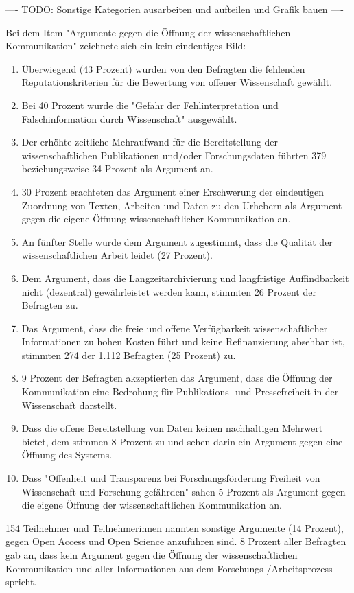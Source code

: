 ---- TODO: Sonstige Kategorien ausarbeiten und aufteilen und Grafik bauen ----

Bei dem Item "Argumente gegen die Öffnung der wissenschaftlichen Kommunikation" zeichnete sich ein kein eindeutiges Bild:
\begin{enumerate}
\item Überwiegend (43 Prozent) wurden von den Befragten die fehlenden Reputationskriterien für die Bewertung von offener Wissenschaft gewählt.
\item Bei 40 Prozent wurde die "Gefahr der Fehlinterpretation und Falschinformation durch Wissenschaft" ausgewählt.
\item Der erhöhte zeitliche Mehraufwand für die Bereitstellung der wissenschaftlichen Publikationen und/oder Forschungsdaten führten 379 beziehungsweise 34 Prozent als Argument an.
\item 30 Prozent erachteten das Argument einer Erschwerung der eindeutigen Zuordnung von Texten, Arbeiten und Daten zu den Urhebern als Argument gegen die eigene Öffnung wissenschaftlicher Kommunikation an.
\item An fünfter Stelle wurde dem Argument zugestimmt, dass die Qualität der wissenschaftlichen Arbeit leidet (27 Prozent).
\item Dem Argument, dass die Langzeitarchivierung und langfristige Auffindbarkeit nicht (dezentral) gewährleistet werden kann, stimmten 26 Prozent der Befragten zu.
\item Das Argument, dass die freie und offene Verfügbarkeit wissenschaftlicher Informationen zu hohen Kosten führt und keine Refinanzierung absehbar ist, stimmten 274 der 1.112 Befragten (25 Prozent) zu.
\item 9 Prozent der Befragten akzeptierten das Argument, dass die Öffnung der Kommunikation eine Bedrohung für Publikations- und Pressefreiheit in der Wissenschaft darstellt.
\item Dass die offene Bereitstellung von Daten keinen nachhaltigen Mehrwert bietet, dem stimmen 8 Prozent zu und sehen darin ein Argument gegen eine Öffnung des Systems.
\item Dass "Offenheit und Transparenz bei Forschungsförderung Freiheit von Wissenschaft und Forschung gefährden" sahen 5 Prozent als Argument gegen die eigene Öffnung der wissenschaftlichen Kommunikation an.
\end{enumerate}

154 Teilnehmer und Teilnehmerinnen nannten sonstige Argumente (14 Prozent), gegen Open Access und Open Science anzuführen sind. 8 Prozent aller Befragten gab an, dass kein Argument gegen die Öffnung der wissenschaftlichen Kommunikation und aller Informationen aus dem Forschungs-/Arbeitsprozess spricht.

